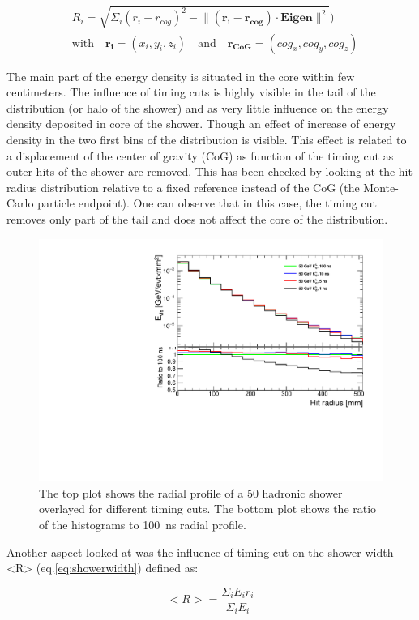 \begin{equation} \label{eq:radialprof}
  \begin{split}
    & R_{i} = \sqrt{\Sigma_{i} (r_{i} - r_{cog})^{2} - \lVert (\mathbf{r_{i}} - \mathbf{r_{cog}}) \cdot \mathbf{Eigen} \rVert^{2}}) \\
    & \text{with} \quad \mathbf{r_{i}} = (x_i, y_i, z_i) \quad \text{and} \quad \mathbf{r_{CoG}} = (cog_x, cog_y, cog_z)
  \end{split}
\end{equation}

The main part of the energy density is situated in the core within few centimeters. The influence of timing cuts is highly visible in the tail of the distribution (or halo of the shower) and as very little influence on the energy density deposited in core of the shower. Though an effect of increase of energy density in the two first bins of the distribution is visible. This effect is related to a displacement of the center of gravity (CoG) as function of the timing cut as outer hits of the shower are removed. This has been checked by looking at the hit radius distribution relative to a fixed reference instead of the CoG (the Monte-Carlo particle endpoint). One can observe that in this case, the timing cut removes only part of the tail and does not affect the core of the distribution.

\begin{figure}[htbp!]
  \centering
  \includegraphics[width=0.5\linewidth]{chap6/fig_TimingILD/NoSmearing/RadialProfileOverlay_noSmearing}
  \caption{The top plot shows the radial profile of a 50 \GeV hadronic shower overlayed for different timing cuts. The bottom plot shows the ratio of the histograms to \SI{100}{\nano\second} radial profile.} \label{fig:RadialProfNoSmearing}
\end{figure}

Another aspect looked at was the influence of timing cut on the shower width <R> (eq.\ref{eq:showerwidth}) defined as:

\begin{equation} \label{eq:showerwidth}
  <R> = \frac{\Sigma_i E_i r_i}{\Sigma_i E_i}
\end{equation}
\vspace{1ex}

